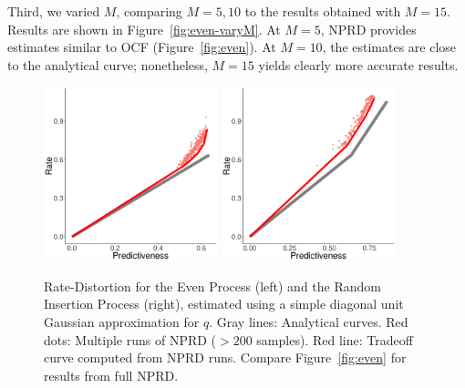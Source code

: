 \documentclass[entropy,article,submit,moreauthors,pdftex,10pt,a4paper]{Definitions/mdpi}
\begin{document}
Third, we varied $M$, comparing $M=5, 10$ to the results obtained with $M=15$. 
Results are shown in Figure~\ref{fig:even-varyM}.
At $M=5$, NPRD provides estimates similar to OCF (Figure~\ref{fig:even}).
At $M=10$, the estimates are close to the analytical curve; nonetheless, $M=15$ yields clearly more accurate results.


\begin{figure}
\centering
\includegraphics[width=0.45\textwidth]{code/figures/even-info-noFlow.pdf}
\includegraphics[width=0.45\textwidth]{code/figures/rip-info-noFlow.pdf}

	\caption{Rate-Distortion for the Even Process (left) and the Random Insertion Process (right), estimated using a simple diagonal unit Gaussian approximation for $q$. Gray lines: Analytical curves. Red dots: Multiple runs of NPRD ($> 200$ samples). Red line: Tradeoff curve computed from NPRD runs. Compare Figure~\ref{fig:even} for results from full NPRD. }\label{fig:even-noFlow}
\end{figure}
\end{document}
